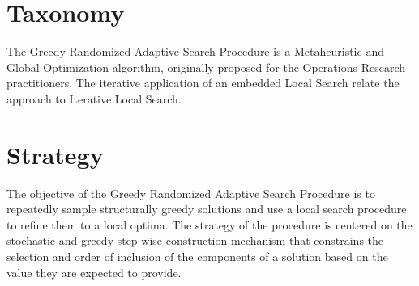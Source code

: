 \documentclass[a4paper, 11pt]{article}
\begin{document}
\section{Taxonomy}
\label{sec:taxonomy}
The Greedy Randomized Adaptive Search Procedure is a Metaheuristic and Global Optimization algorithm, originally proposed for the Operations Research practitioners.
The iterative application of an embedded Local Search relate the approach to Iterative Local Search.

\section{Strategy}
\label{sec:strategy}
The objective of the Greedy Randomized Adaptive Search Procedure is to repeatedly sample structurally greedy solutions and use a local search procedure to refine them to a local optima.
The strategy of the procedure is centered on the stochastic and greedy step-wise construction mechanism that constrains the selection and order of inclusion of the components of a solution based on the value they are expected to provide. 

\end{document}
